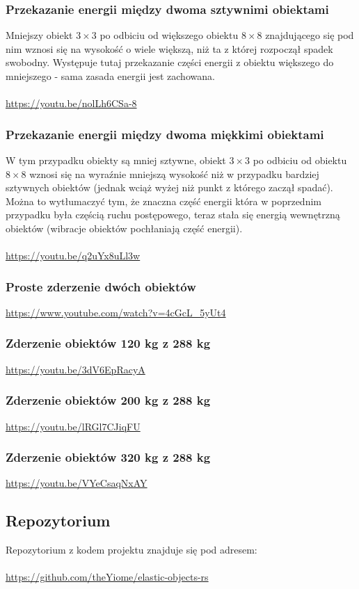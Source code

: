 \documentclass[12pt, letterpaper]{report}
\begin{document}
    \subsubsection{Przekazanie energii między dwoma sztywnimi obiektami}

    Mniejszy obiekt $3 \times 3$ po odbiciu od większego obiektu $8 \times  8$ znajdującego się 
    pod nim wznosi się na
    wysokość o wiele większą, niż ta z której rozpoczął spadek swobodny.
    Występuje tutaj przekazanie części energii z obiektu większego do mniejszego - sama zasada energii jest zachowana.
    \\
    \\
    \url{https://youtu.be/nolLh6CSa-8}

    \subsubsection{Przekazanie energii między dwoma miękkimi obiektami}
    W tym przypadku obiekty są mniej sztywne,
    obiekt $3 \times 3$ po odbiciu od obiektu $8 \times  8$ wznosi się na wyraźnie mniejszą wysokość niż w przypadku bardziej sztywnych obiektów
    (jednak wciąż wyżej niż punkt z którego zaczął spadać). Można to wytłumaczyć tym,
    że znaczna część energii która w poprzednim przypadku była częścią ruchu postępowego,
    teraz stała się energią wewnętrzną obiektów (wibracje obiektów pochłaniają część energii).
    \\
    \\
    \url{https://youtu.be/q2uYx8uLl3w}

    \subsubsection{Proste zderzenie dwóch obiektów}
    \url{https://www.youtube.com/watch?v=4cGcL_5yUt4}

    \subsubsection{Zderzenie obiektów 120 kg z 288 kg}
    \url{https://youtu.be/3dV6EpRacyA}

    \subsubsection{Zderzenie obiektów 200 kg z 288 kg}
    \url{https://youtu.be/lRGl7CJiqFU}

    \subsubsection{Zderzenie obiektów 320 kg z 288 kg}
    \url{https://youtu.be/VYeCsaqNxAY}

    \subsection{Repozytorium}
    Repozytorium z kodem projektu znajduje się pod adresem:
    \\
    \\
    \url{https://github.com/theYiome/elastic-objects-rs}
\end{document}
